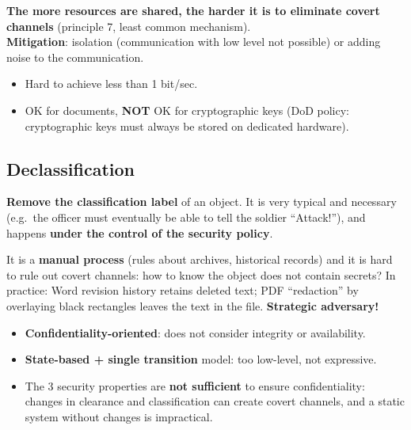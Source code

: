 \begin{propbox}[title=Covert channels and least common mechanism]
\textbf{The more resources are shared, the harder it is to eliminate covert channels}
(principle 7, least common mechanism). \\
\textbf{Mitigation}: isolation (communication with low level not possible) or adding
noise to the communication.
\begin{itemize}
  \item Hard to achieve less than 1 bit/sec.
  \item OK for documents, \textbf{NOT} OK for cryptographic keys (DoD policy:
        cryptographic keys must always be stored on dedicated hardware).
\end{itemize}
\end{propbox}

\subsection{Declassification}

\begin{defnbox}[title=Declassification]
\textbf{Remove the classification label} of an object. It is very typical and necessary
(e.g.\ the officer must eventually be able to tell the soldier ``Attack!''), and happens
\textbf{under the control of the security policy}.
\end{defnbox}

\begin{warnbox}[title=Declassification cannot be made inherently safe]
It is a \textbf{manual process} (rules about archives, historical records) and it is hard
to rule out covert channels: how to know the object does not contain secrets? In
practice: Word revision history retains deleted text; PDF ``redaction'' by overlaying
black rectangles leaves the text in the file. \textbf{Strategic adversary!}
\end{warnbox}

\begin{warnbox}[title=BLP limitations]
\begin{itemize}
  \item \textbf{Confidentiality-oriented}: does not consider integrity or availability.
  \item \textbf{State-based + single transition} model: too low-level, not expressive.
  \item The 3 security properties are \textbf{not sufficient} to ensure
        confidentiality: changes in clearance and classification can create covert
        channels, and a static system without changes is impractical.
\end{itemize}
\end{warnbox}

